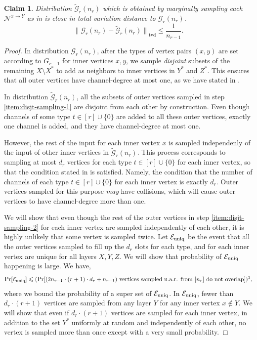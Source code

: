\documentclass[11pt]{article}
\newtheorem{claim}[lemma]{Claim}
\theoremstyle{definition}
\renewcommand{\leq}{\leqslant}
\newcommand{\tvd}[2]{\ensuremath{\norm{#1 - #2}_{\mathrm{tvd}}}}
\newcommand{\norm}[1]{\ensuremath{\|#1\|}}
\DeclareMathOperator*{\Prob}{\ensuremath{\textnormal{Pr}}}
\renewcommand{\Pr}{\Prob}
\newcommand{\Xstar}{\ensuremath{X^{*}}}
\newcommand{\Ystar}{\ensuremath{Y^{*}}}
\newcommand{\Zstar}{\ensuremath{Z^{*}}}
\newcommand{\Nbhood}[3]{\ensuremath{\mathcal{N}^{#1_{#3} \to #2}}}
\newcommand{\cG}{\ensuremath{\mathcal{G}}}
\newcommand{\cGtil}{\ensuremath{\widetilde{\cG}}}
\newcommand{\Euniq}{\ensuremath{\mathcal{E}_{\textnormal{uniq}}}}
\begin{document}
\begin{claim}\label{clm:cG-cGtil-close}
Distribution $\cGtil_r(n_r)$ which is obtained by marginally sampling each $\Nbhood{x}{Y}{}$ as in  is close in total variation distance to $\cG_r(n_r)$. 
\[
	\tvd{\cG_r(n_r)}{\cGtil_r(n_r)} \leq \frac1{n_{r-1}}.
\]
\end{claim}
\begin{proof}
In distribution $\cG_r(n_r)$, after the types of vertex pairs $(x, y)$ are set according to $G_{r-1}$ for inner vertices $x, y$, we sample \emph{disjoint} subsets of the remaining $X \setminus \Xstar$ to add as neighbors to inner vertices in $\Ystar$ and $\Zstar$. This ensures that all outer vertices have channel-degree at most one, as we have stated in . 

In distribution $\cGtil_r(n_r)$, all the subsets of outer vertices sampled in step \ref{item:disjt-sampling-1} are disjoint from each other by construction. Even though channels of some type $t \in [r] \cup \{0\}$ are added to all these outer vertices, exactly one channel is added, and they have channel-degree at most one. 

However, the rest of the input for each inner vertex $x$ is sampled independenly of the input of other inner vertices in $\cGtil_r(n_r)$. 
This process corresponds to sampling at most $d_r$ vertices for each type $t \in [r] \cup \{0\}$ for each inner vertex, so that the condition stated in  is satisfied. Namely, the condition that the number of channels of each type $t \in [r] \cup \{0\}$ for each inner vertex is exactly $d_r$. Outer vertices sampled for this purpose \emph{may} have collisions, which will cause outer vertices to have channel-degree more than one.

 
We will show that even though the rest of the outer vertices in step \ref{item:disjt-sampling-2} for each inner vertex are sampled independently of each other, it is highly unlikely that some vertex is sampled twice. Let $\Euniq$ be the event that all the outer vertices sampled to fill up the $d_r$ slots for each type, and for each inner vertex are unique for all layers $X, Y, Z$. We will show that probability of $\Euniq$ happening is large. We have, 
\begin{align*}
\Pr[\Euniq] \leq (\Pr[(2n_{r-1} \cdot (r+1) \cdot d_r  + n_{r-1})\textnormal{ vertices sampled u.a.r. from $[n_r]$ do not overlap}])^3,
\end{align*}
where we bound the probability of a super set of $\Euniq$. In $\Euniq$, fewer than $d_r \cdot (r+1)$ vertices are sampled from any layer $Y$ for any inner vertex $x \notin Y$. We will show that even if $d_r \cdot (r+1)$ vertices are sampled for each inner vertex, in addition to the set $\Ystar$ uniformly at random and independently of each other, no vertex is sampled more than once except with a very small probability. 


\end{proof}
\end{document}
